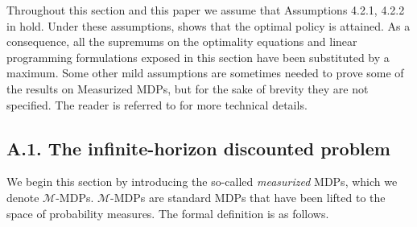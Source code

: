 \documentclass[12pt,a4paper]{article}
\newcommand{\mM}{\mathcal{M}}
\begin{document}
		Throughout this section and this paper we assume that Assumptions 4.2.1, 4.2.2  in \cite{lerma} hold. Under these assumptions, \cite{measurized} shows that the optimal policy is attained. As a consequence, all the supremums on the optimality equations and linear programming formulations exposed in this section have been substituted by a maximum. Some other mild assumptions are sometimes needed to prove some of the results on Measurized MDPs, but for the sake of brevity they are not specified. The reader is referred to \cite{measurized} for more technical details.
		
		\subsection*{A.1. The infinite-horizon discounted problem}
		
		
		
		
We begin this section by introducing the so-called {\it measurized} MDPs, which we denote $\mM$-MDPs.  $\mM$-MDPs are standard MDPs that have been lifted to the space of probability measures. The formal definition is as follows.\\
\end{document}
